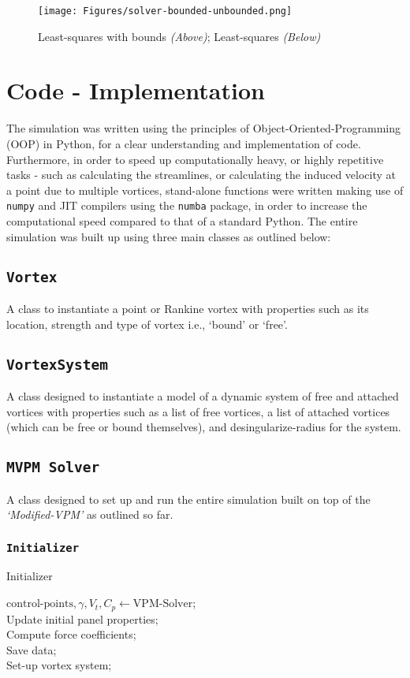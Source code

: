 \begin{figure}[H]
	\centering
	\texttt{[image: Figures/solver-bounded-unbounded.png]}
	\caption{Least-squares with bounds \textit{(Above)}; Least-squares \textit{(Below)}}
	\label{fig:solver-bounded-unbounded}
\end{figure}

\section{Code - Implementation}
The simulation was written using the principles of Object-Oriented-Programming (OOP) in Python, for a clear understanding and implementation of code. Furthermore, in order to speed up computationally heavy, or highly repetitive tasks - such as calculating the streamlines, or calculating the induced velocity at a point due to multiple vortices, stand-alone functions were written making use of \texttt{numpy} and JIT compilers using the \texttt{numba} package, in order to increase the computational speed compared to that of a standard Python.
The entire simulation was built up using three main classes as outlined below:
\subsection{\texttt{Vortex}}
A class to instantiate a point or Rankine vortex with properties such as its location, strength and type of vortex i.e., `bound' or `free'.

\subsection{\texttt{VortexSystem}}
A class designed to instantiate a model of a dynamic system of free and attached vortices with properties such as a list of free vortices, a list of attached vortices (which can be free or bound themselves), and desingularize-radius for the system.

\subsection{\texttt{MVPM Solver}}
A class designed to set up and run the entire simulation built on top of the \textit{`Modified-VPM'} as outlined so far.

\subsubsection{\texttt{Initializer}}
\begin{algorithm}[H]
    \caption{Initializer}
    $\text{control-points}, \gamma, V_t, C_p \gets \text{VPM-Solver}$;
    \\ Update initial panel properties;
    \\ Compute force coefficients;
    \\ Save data;
    \\ Set-up vortex system;
\end{algorithm}

